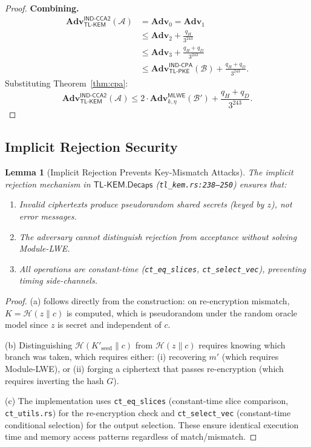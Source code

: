 \documentclass[11pt,a4paper]{article}
\newtheorem{lemma}[theorem]{Lemma}
\theoremstyle{definition}
\newcommand{\Adv}{\mathbf{Adv}}
\newcommand{\Decaps}{\textsf{Decaps}}
\newcommand{\MLWE}{\textsf{MLWE}}
\newcommand{\TLKEM}{\textsf{TL-KEM}}
\newcommand{\INDCPA}{\textsf{IND-CPA}}
\newcommand{\INDCCA}{\textsf{IND-CCA2}}
\newcommand{\CPAPKE}{\textsf{TL-PKE}}
\newcommand{\Hash}{\mathcal{H}}
\begin{document}
\begin{proof}
\medskip
\noindent\textbf{Combining.}
\begin{align*}
  \Adv^{\INDCCA}_{\TLKEM}(\mathcal{A})
  &= \Adv_0 = \Adv_1 \\
  &\leq \Adv_2 + \frac{q_H}{3^{243}} \\
  &\leq \Adv_3 + \frac{q_H + q_D}{3^{243}} \\
  &\leq \Adv^{\INDCPA}_{\CPAPKE}(\mathcal{B})
    + \frac{q_H + q_D}{3^{243}}.
\end{align*}
Substituting Theorem~\ref{thm:cpa}:
\[
  \Adv^{\INDCCA}_{\TLKEM}(\mathcal{A})
  \leq 2 \cdot \Adv^{\MLWE}_{k,\eta}(\mathcal{B}')
    + \frac{q_H + q_D}{3^{243}}.
\]
\end{proof}

\subsection{Implicit Rejection Security}
\label{sec:implicit-reject}

\begin{lemma}[Implicit Rejection Prevents Key-Mismatch Attacks]
\label{lem:reject}
The implicit rejection mechanism in $\TLKEM.\Decaps$ (\texttt{tl\_kem.rs:238--250}) ensures that:
\begin{enumerate}[leftmargin=2em, label=(\alph*)]
  \item Invalid ciphertexts produce pseudorandom shared secrets (keyed by $z$), not error messages.
  \item The adversary cannot distinguish rejection from acceptance without solving Module-LWE.
  \item All operations are constant-time (\texttt{ct\_eq\_slices}, \texttt{ct\_select\_vec}), preventing timing side-channels.
\end{enumerate}
\end{lemma}

\begin{proof}
(a) follows directly from the construction: on re-encryption mismatch, $K = \Hash(z \| c)$ is computed, which is pseudorandom under the random oracle model since $z$ is secret and independent of $c$.

(b) Distinguishing $\Hash(K'_{\text{seed}} \| c)$ from $\Hash(z \| c)$ requires knowing which branch was taken, which requires either: (i) recovering $m'$ (which requires Module-LWE), or (ii) forging a ciphertext that passes re-encryption (which requires inverting the hash $G$).

(c) The implementation uses \texttt{ct\_eq\_slices} (constant-time slice comparison, \texttt{ct\_utils.rs}) for the re-encryption check and \texttt{ct\_select\_vec} (constant-time conditional selection) for the output selection. These ensure identical execution time and memory access patterns regardless of match/mismatch.
\end{proof}
\end{document}
